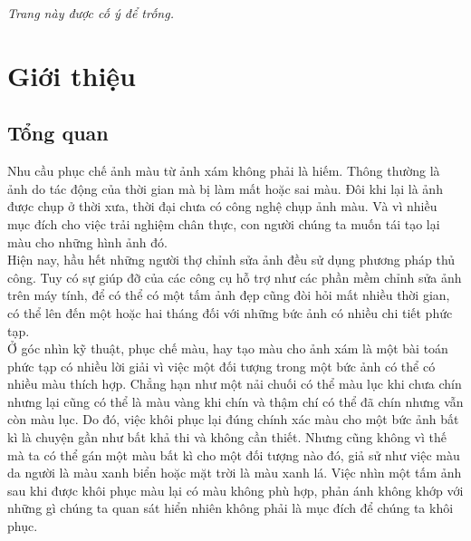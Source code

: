 \documentclass[a4paper, 12pt]{article}
\begin{document}
\newpage

\tableofcontents

\newpage

\renewcommand{\listfigurename}{Danh sách hình}
\listoffigures

\newpage

\listoftables

\newpage
\vspace*{\fill}
{\centering \textit{Trang này được cố ý để trống.}\par}
\vspace{\fill}

\newpage

\fancyfoot[R]{\scriptsize \ttfamily {\thepage}/\pageref{LastPage}}

\section{Giới thiệu}

\subsection{Tổng quan}
Nhu cầu phục chế ảnh màu từ ảnh xám không phải là hiếm. Thông thường là ảnh do tác động của thời gian mà bị làm mất hoặc sai màu. Đôi khi lại là ảnh được chụp ở thời xưa, thời đại chưa có công nghệ chụp ảnh màu. Và vì nhiều mục đích cho việc trải nghiệm chân thực, con người chúng ta muốn tái tạo lại màu cho những hình ảnh đó.\vspace{5pt}\\
Hiện nay, hầu hết những người thợ chỉnh sửa ảnh đều sử dụng phương pháp thủ công. Tuy có sự giúp đỡ của các công cụ hỗ trợ như các phần mềm chỉnh sửa ảnh trên máy tính, để có thể có một tấm ảnh đẹp cũng đòi hỏi mất nhiều thời gian, có thể lên đến một hoặc hai tháng đối với những bức ảnh có nhiều chi tiết phức tạp.\vspace{5pt}\\
Ở góc nhìn kỹ thuật, phục chế màu, hay tạo màu cho ảnh xám là một bài toán phức tạp có nhiều lời giải vì việc một đối tượng trong một bức ảnh có thể có nhiều màu thích hợp. Chẳng hạn như một nải chuối có thể màu lục khi chưa chín nhưng lại cũng có thể là màu vàng khi chín và thậm chí có thể đã chín nhưng vẫn còn màu lục. Do đó, việc khôi phục lại đúng chính xác màu cho một bức ảnh bất kì là chuyện gần như bất khả thi và không cần thiết. Nhưng cũng không vì thế mà ta có thể gán một màu bất kì cho một đối tượng nào đó, giả sử như việc màu da người là màu xanh biển hoặc mặt trời là màu xanh lá. Việc nhìn một tấm ảnh sau khi được khôi phục màu lại có màu không phù hợp, phản ánh không khớp với những gì chúng ta quan sát hiển nhiên không phải là mục đích để chúng ta khôi phục.\vspace{5pt}\\
\end{document}
